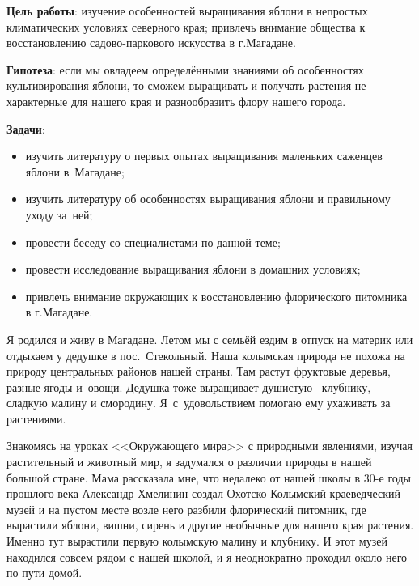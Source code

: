 \bigskip
{}



\makeProcTitleSchool


\textbf{Цель работы}: изучение особенностей выращивания яблони в непростых климатических условиях северного края; привлечь внимание общества к восстановлению садово-паркового искусства в г.Магадане.

\textbf{Гипотеза}: если мы овладеем определёнными знаниями об особенностях культивирования яблони, то сможем выращивать и получать растения не характерные для нашего края и разнообразить флору нашего города.

\textbf{Задачи}:

\begin{itemize}[noitemsep]\vspace{-8pt}
\item изучить литературу о первых опытах выращивания маленьких саженцев яблони в~Магадане;
\item изучить литературу об особенностях выращивания яблони и правильному уходу за~ней;
\item провести беседу со специалистами по данной теме;
\item провести исследование  выращивания яблони в домашних условиях;
\item привлечь внимание окружающих к восстановлению флорического питомника в г.Ма\-га\-да\-не.
\end{itemize}\vspace{-8pt}

Я родился и живу в Магадане. Летом мы с семьёй ездим в отпуск на материк или отдыхаем у дедушке в пос.~Стекольный. Наша колымская природа не похожа на природу центральных районов нашей страны. Там растут фруктовые деревья, разные ягоды и~овощи. Дедушка тоже выращивает душистую  клубнику, сладкую малину и смородину. Я~с~удовольствием помогаю ему ухаживать за растениями.

Знакомясь на уроках <<Окружающего мира>> с природными явлениями, изучая растительный и животный мир, я задумался о различии природы в нашей большой стране. Мама рассказала мне, что недалеко от нашей школы в 30-е годы прошлого века Александр Хмелинин создал Охотско-Колымский краеведческий музей и на пустом месте возле него разбили флорический питомник, где вырастили яблони, вишни, сирень и другие необычные для нашего края растения. Именно тут вырастили первую колымскую малину и клубнику. И этот музей находился совсем рядом с нашей школой, и я неоднократно проходил около него по пути домой.


